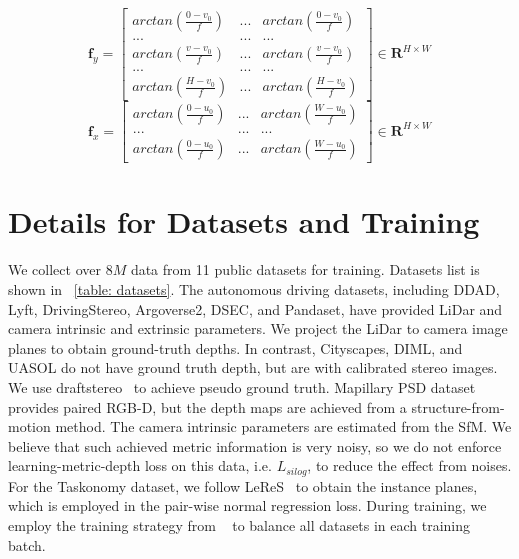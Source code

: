 \documentclass[10pt,onecolumn,letterpaper]{article}
\begin{document}
\begin{equation}
    \mathbf{f}_y =  \begin{bmatrix}
arctan(\frac{0-v_0}{f}) &...  &arctan(\frac{0-v_0}{f}) \\ 
... &...  &... \\ 
arctan(\frac{v-v_0}{f}) &...  &arctan(\frac{v-v_0}{f}) \\ 
... &...  &... \\ 
arctan(\frac{H-v_0}{f}) &...  &arctan(\frac{H-v_0}{f})
\end{bmatrix} \in \mathbf{R}^{H \times W}
\end{equation}
\begin{equation}
\mathbf{f}_{x}=\begin{bmatrix}
arctan(\frac{0-u_0}{f}) &...  &arctan(\frac{W-u_0}{f}) \\ 
... &...  &... \\ 
arctan(\frac{0-u_0}{f}) &...    &arctan(\frac{W-u_0}{f}) 
\end{bmatrix} \in \mathbf{R}^{H \times W}
\end{equation}

\section{Details for Datasets and Training}
We collect over $8M$ data from 11 public datasets for training. Datasets list is shown in ~\ref{table: datasets}. The autonomous driving datasets, including DDAD, Lyft, DrivingStereo, Argoverse2, DSEC, and Pandaset, have provided LiDar and camera intrinsic and extrinsic parameters. We project the LiDar to camera image planes to obtain ground-truth depths. In contrast, Cityscapes, DIML, and UASOL do not have ground truth depth, but are with calibrated stereo images. We use draftstereo~\cite{lipson2021raft} to achieve pseudo ground truth. Mapillary PSD dataset provides paired RGB-D, but the depth maps are achieved from a structure-from-motion method. The camera intrinsic parameters are estimated from the SfM. We believe that such achieved metric information is very noisy, so we do not enforce learning-metric-depth loss on this data, i.e. $L_{silog}$, to reduce the effect from noises. For the Taskonomy dataset, we follow LeReS~\cite{yin2022towards} to obtain the instance planes, which is employed in the pair-wise normal regression loss. During training, we employ the training strategy from ~\cite{yin2020diversedepth_old} to balance all datasets in each training batch. 
\end{document}
